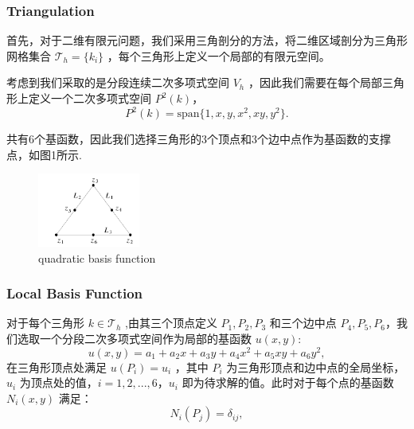\documentclass[11pt]{ctexart}
\begin{document}
\subsubsection{Triangulation}
首先，对于二维有限元问题，我们采用三角剖分的方法，将二维区域剖分为三角形网格集合 $ \mathcal{T}_h=\{k_i\} $ ，每个三角形上定义一个局部的有限元空间。

考虑到我们采取的是分段连续二次多项式空间 $ V_h $ ，因此我们需要在每个局部三角形上定义一个二次多项式空间 $ P^2(k) $，
\begin{equation}
  P^2(k) = \text{span}\{1,x,y,x^2,xy,y^2\}.
\end{equation}

共有6个基函数，因此我们选择三角形的3个顶点和3个边中点作为基函数的支撑点，如图1所示.
\begin{figure}[htbp]
  \centering
  \includegraphics[width=0.3\textwidth]{quadratic.png}
  \caption{quadratic basis function}
  \label{fig: quadratic}
\end{figure}



\subsubsection{Local Basis Function}
对于每个三角形 $ k\in \mathcal{T}_h $ ,由其三个顶点定义 $ P_1,P_2,P_3 $ 和三个边中点 $ P_4,P_5,P_6 $，我们选取一个分段二次多项式空间作为局部的基函数 $ u(x,y) $:
\begin{equation}
      u(x,y) = a_1 + a_2 x + a_3 y + a_4 x^2 + a_5 xy + a_6 y^2,
\end{equation}
在三角形顶点处满足 $ u(P_i) = u_i $ ，其中 $ P_i $ 为三角形顶点和边中点的全局坐标，$ u_i $ 为顶点处的值，$ i=1,2,...,6 $，$ u_i $ 即为待求解的值。此时对于每个点的基函数 $ N_i(x,y) $ 满足：
\begin{equation}
  N_i(P_j) = \delta_{ij},
\end{equation}
\end{document}
